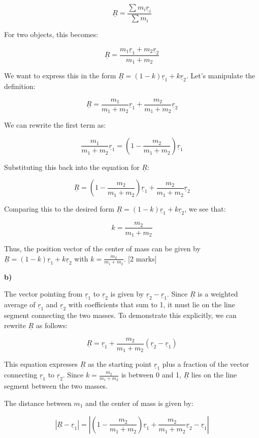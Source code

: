 \documentclass{article}
\begin{document}
$$\underline{R} = \frac{\sum m_i \underline{r}_i}{\sum m_i}$$

For two objects, this becomes:

$$\underline{R} = \frac{m_1 \underline{r}_1 + m_2 \underline{r}_2}{m_1 + m_2}$$

We want to express this in the form $\underline{R} = (1-k)\underline{r}_1 + k\underline{r}_2$.  Let's manipulate the definition:

$$\underline{R} = \frac{m_1}{m_1 + m_2} \underline{r}_1 + \frac{m_2}{m_1 + m_2} \underline{r}_2$$

We can rewrite the first term as:

$$\frac{m_1}{m_1 + m_2} \underline{r}_1 = \left(1 - \frac{m_2}{m_1 + m_2}\right) \underline{r}_1$$

Substituting this back into the equation for $\underline{R}$:

$$\underline{R} = \left(1 - \frac{m_2}{m_1 + m_2}\right) \underline{r}_1 + \frac{m_2}{m_1 + m_2} \underline{r}_2$$

Comparing this to the desired form $\underline{R} = (1-k)\underline{r}_1 + k\underline{r}_2$, we see that:

$$k = \frac{m_2}{m_1 + m_2}$$

Thus, the position vector of the center of mass can be given by $\underline{R} = (1-k)\underline{r}_1 + k\underline{r}_2$ with $k = \frac{m_2}{m_1 + m_2}$. [2 marks]

\textbf{b)}

The vector pointing from $\underline{r}_1$ to $\underline{r}_2$ is given by $\underline{r}_2 - \underline{r}_1$. Since $\underline{R}$ is a weighted average of $\underline{r}_1$ and $\underline{r}_2$ with coefficients that sum to 1, it must lie on the line segment connecting the two masses. To demonstrate this explicitly, we can rewrite $\underline{R}$ as follows:

$$\underline{R} = \underline{r}_1 + \frac{m_2}{m_1+m_2} (\underline{r}_2 - \underline{r}_1)$$

This equation expresses $\underline{R}$ as the starting point $\underline{r}_1$ plus a fraction of the vector connecting $\underline{r}_1$ to $\underline{r}_2$.  Since $k = \frac{m_2}{m_1+m_2}$ is between 0 and 1, $\underline{R}$ lies on the line segment between the two masses.

The distance between $m_1$ and the center of mass is given by:

$$|\underline{R} - \underline{r}_1| = \left| \left(1 - \frac{m_2}{m_1 + m_2}\right)\underline{r}_1 + \frac{m_2}{m_1 + m_2}\underline{r}_2 - \underline{r}_1 \right|$$
\end{document}
